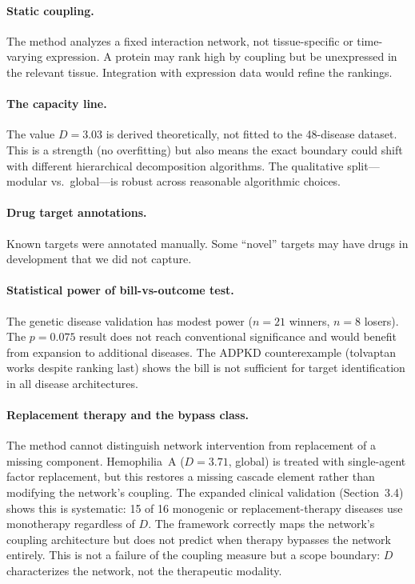 \documentclass[11pt,a4paper]{article}
\begin{document}
\paragraph{Static coupling.} The method analyzes a fixed interaction network, not tissue-specific or time-varying expression. A protein may rank high by coupling but be unexpressed in the relevant tissue. Integration with expression data would refine the rankings.

\paragraph{The capacity line.} The value $D = 3.03$ is derived theoretically, not fitted to the 48-disease dataset. This is a strength (no overfitting) but also means the exact boundary could shift with different hierarchical decomposition algorithms. The qualitative split---modular vs.\ global---is robust across reasonable algorithmic choices.

\paragraph{Drug target annotations.} Known targets were annotated manually. Some ``novel'' targets may have drugs in development that we did not capture.

\paragraph{Statistical power of bill-vs-outcome test.} The genetic disease validation has modest power ($n = 21$ winners, $n = 8$ losers). The $p = 0.075$ result does not reach conventional significance and would benefit from expansion to additional diseases. The ADPKD counterexample (tolvaptan works despite ranking last) shows the bill is not sufficient for target identification in all disease architectures.

\paragraph{Replacement therapy and the bypass class.} The method cannot distinguish network intervention from replacement of a missing component. Hemophilia~A ($D = 3.71$, global) is treated with single-agent factor replacement, but this restores a missing cascade element rather than modifying the network's coupling. The expanded clinical validation (Section~3.4) shows this is systematic: 15 of 16 monogenic or replacement-therapy diseases use monotherapy regardless of $D$. The framework correctly maps the network's coupling architecture but does not predict when therapy bypasses the network entirely. This is not a failure of the coupling measure but a scope boundary: $D$ characterizes the network, not the therapeutic modality.
\end{document}
